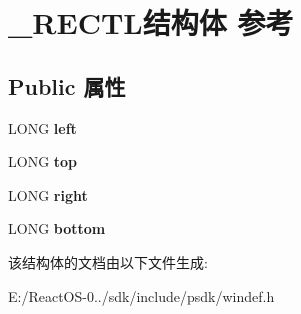 \hypertarget{struct___r_e_c_t_l}{}\section{\+\_\+\+R\+E\+C\+T\+L结构体 参考}
\label{struct___r_e_c_t_l}
\subsection*{Public 属性}
\begin{DoxyCompactItemize}
\item 
\mbox{\label{struct___r_e_c_t_l_a07e77f356e02e4779c5a77b471352bd2}} 
L\+O\+NG {\bfseries left}
\item 
\mbox{\label{struct___r_e_c_t_l_a0077ee0901ba9585daa0f8adb85e59a1}} 
L\+O\+NG {\bfseries top}
\item 
\mbox{\label{struct___r_e_c_t_l_a3277477ece352496fa5d4598deb8b5d4}} 
L\+O\+NG {\bfseries right}
\item 
\mbox{\label{struct___r_e_c_t_l_af6ad8ec7e24156b8b660e59e0e6cad80}} 
L\+O\+NG {\bfseries bottom}
\end{DoxyCompactItemize}


该结构体的文档由以下文件生成\+:\begin{DoxyCompactItemize}
\item 
E\+:/\+React\+O\+S-\/0../sdk/include/psdk/windef.\+h\end{DoxyCompactItemize}
